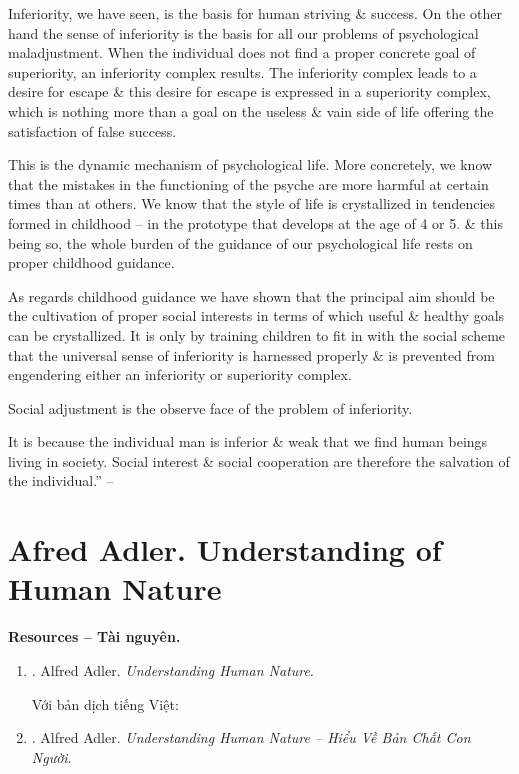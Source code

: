 \documentclass{article}
\begin{document}
Inferiority, we have seen, is the basis for human striving \& success. On the other hand the sense of inferiority is the basis for all our problems of psychological maladjustment. When the individual does not find a proper concrete goal of superiority, an inferiority complex results. The inferiority complex leads to a desire for escape \& this desire for escape is expressed in a superiority complex, which is nothing more than a goal on the useless \& vain side of life offering the satisfaction of false success.

This is the dynamic mechanism of psychological life. More concretely, we know that the mistakes in the functioning of the psyche are more harmful at certain times than at others. We know that the style of life is crystallized in tendencies formed in childhood -- in the prototype that develops at the age of 4 or 5. \& this being so, the whole burden of the guidance of our psychological life rests on proper childhood guidance.

As regards childhood guidance we have shown that the principal aim should be the cultivation of proper social interests in terms of which useful \& healthy goals can be crystallized. It is only by training children to fit in with the social scheme that the universal sense of inferiority is harnessed properly \& is prevented from engendering either an inferiority or superiority complex.

Social adjustment is the observe face of the problem of inferiority.

It is because the individual man is inferior \& weak that we find human beings living in society. Social interest \& social cooperation are therefore the salvation of the individual.'' -- \cite[pp. 263--264]{Adler_science_living}



\section{Afred Adler. Understanding of Human Nature}
\textbf{\textsf{Resources -- Tài nguyên.}}
\begin{enumerate}
	\item \cite{Adler_human_nature}. {\sc Alfred Adler}. {\it Understanding Human Nature}.
	
	Với bản dịch tiếng Việt:
	\item \cite{Adler_human_nature_VN}. {\sc Alfred Adler}. {\it Understanding Human Nature -- Hiểu Về Bản Chất Con Người}.
\end{enumerate}
\end{document}
